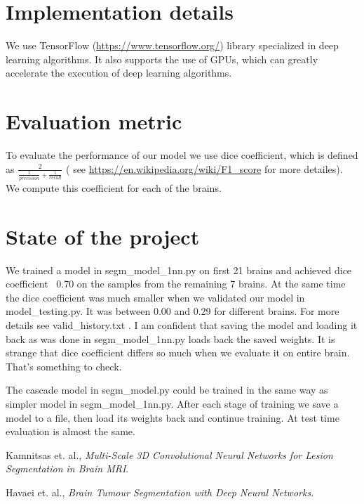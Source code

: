 \documentclass[12pt]{report}
\begin{document}
\section*{Implementation details}

We use TensorFlow (\url{https://www.tensorflow.org/}) library specialized in deep learning algorithms. It also supports the use of GPUs, which can greatly accelerate the execution of deep learning algorithms.

\section*{Evaluation metric}

To evaluate the performance of our model we use dice coefficient, which is defined as $\frac{2}{\frac{1}{precision}+ \frac{1}{recall}}$ ( see \url{https://en.wikipedia.org/wiki/F1_score} for more detailes). We compute this coefficient for each of the brains.

\section*{State of the project}
We trained a model in segm\_model\_1nn.py on first 21 brains and achieved dice coefficient ~0.70 on the samples from the remaining 7 brains. At the same time the dice coefficient was much smaller when we validated our model in model\_testing.py. It was between 0.00 and 0.29 for different brains. For more details see valid\_history.txt . I am confident that saving the model and loading it back as was done in segm\_model\_1nn.py loads back the saved weights. It is strange that dice coefficient differs so much when we evaluate it on entire brain. That's something to check. 

The cascade model in segm\_model.py could be trained in the same way as simpler model in segm\_model\_1nn.py. After each stage of training we save a model to a file, then load its weights back and continue training. At test time evaluation is almost the same.  

\begin{thebibliography}{ABCDE}

 Kamnitsas et. al., {\em Multi-Scale 3D Convolutional Neural Networks for Lesion Segmentation in Brain MRI}.

 Havaei et. al., {\em Brain Tumour Segmentation with Deep Neural Networks}.

\end{thebibliography}
\end{document}
